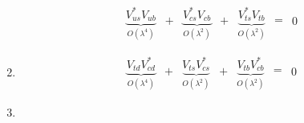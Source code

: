 \begin{enumerate}
\begin{equation}
\begin{matrix} \underbrace{V_{us}^*V_{ub}}_{O(\lambda^4)} \end{matrix} \begin{matrix} {+}\\{ } \end{matrix} \begin{matrix} \underbrace{V_{cs}^*V_{cb}}_{O(\lambda^2)} \end{matrix} \begin{matrix} {+}\\{ } \end{matrix} \begin{matrix} \underbrace{V_{ts}^*V_{tb}}_{O(\lambda^2)} \end{matrix} \begin{matrix} {=}\\{ } \end{matrix} \begin{matrix} {0}\\{ } \end{matrix}
 \end{equation}
 \item \begin{equation}
\begin{matrix} \underbrace{V_{td}V_{cd}^*}_{O(\lambda^4)} \end{matrix} \begin{matrix} {+}\\{ } \end{matrix} \begin{matrix} \underbrace{V_{ts}V_{cs}^*}_{O(\lambda^2)} \end{matrix} \begin{matrix} {+}\\{ } \end{matrix} \begin{matrix} \underbrace{V_{tb}V_{cb}^*}_{O(\lambda^2)} \end{matrix} \begin{matrix} {=}\\{ } \end{matrix} \begin{matrix} {0}\\{ } \end{matrix}
 \end{equation}
 \item \begin{equation}

\end{equation}
\end{enumerate}
